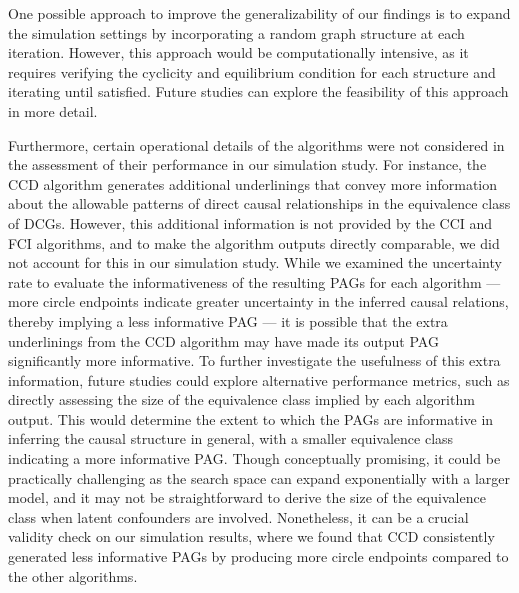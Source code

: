 \documentclass[twoside, 11pt]{article}
\begin{document}
One possible approach to improve the generalizability of our findings is to expand the simulation settings by incorporating a random graph structure at each iteration. However, this approach would be computationally intensive, as it requires verifying the cyclicity and equilibrium condition for each structure and iterating until satisfied. Future studies can explore the feasibility of this approach in more detail.


Furthermore, certain operational details of the algorithms were not considered in the assessment of their performance in our simulation study.
For instance, the CCD algorithm generates additional underlinings that convey more information about the allowable patterns of direct causal relationships in the equivalence class of DCGs. However, this additional information is not provided by the CCI and FCI algorithms, and to make the algorithm outputs directly comparable, we did not account for this in our simulation study. 
While we examined the uncertainty rate to evaluate the informativeness of the resulting PAGs for each algorithm --- more circle endpoints indicate greater uncertainty in the inferred causal relations, thereby implying a less informative PAG --- it is possible that the extra underlinings from the CCD algorithm may have made its output PAG significantly more informative. To further investigate the usefulness of this extra information, future studies could explore alternative performance metrics, such as directly assessing the size of the equivalence class implied by each algorithm output. 
This would determine the extent to which the PAGs are informative in inferring the causal structure in general, with a smaller equivalence class indicating a more informative PAG. Though conceptually promising, it could be practically challenging as the search space can expand exponentially with a larger model, and it may not be straightforward to derive the size of the equivalence class when latent confounders are involved. Nonetheless, it can be a crucial validity check on our simulation results, where we found that CCD consistently generated less informative PAGs by producing more circle endpoints compared to the other algorithms.

\end{document}
